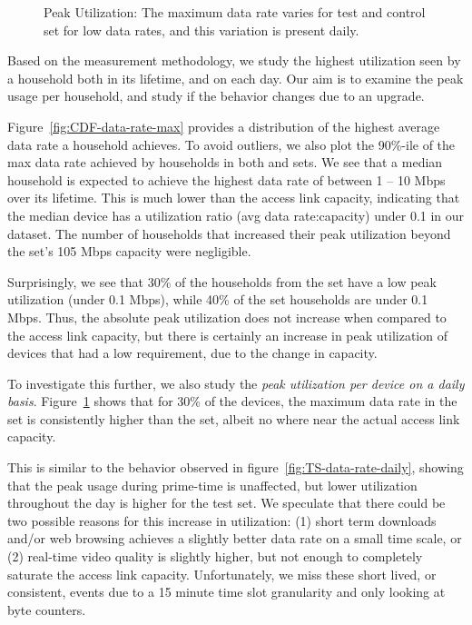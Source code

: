 \begin{figure}[ht!]
\begin{minipage}{0.90\linewidth}
\begin{subfigure}[b]{0.90\linewidth}
  \label{fig:CDF-data-rate-max-daily}
\end{subfigure}
\end{minipage}
\caption{Peak Utilization: The maximum data rate varies for test and control 
set 
for low data rates, and this variation is present daily.}
\label{fig:peak-utilization}
\end{figure}



Based on the measurement methodology, we study the highest utilization seen by a 
household
both in its lifetime, and on each day. Our aim is to examine the peak usage per 
household, and
study if the behavior changes due to an upgrade.

Figure~\ref{fig:CDF-data-rate-max} provides a distribution of the highest 
average
data rate a household achieves. To avoid outliers, we also plot the 90\%-ile of 
the max
data rate achieved by households in both \test and \control sets. We see that a 
median
household is expected to achieve the highest data rate of between 1 -- 10 Mbps 
over its
lifetime. This is much lower than the access link capacity,
indicating that the median device has a utilization ratio (avg data 
rate:capacity) under
0.1 in our dataset. The number of households that increased their peak 
utilization beyond
the \control set's 105 Mbps capacity were negligible.

Surprisingly, we see that 30\% of the households from the \test set have a low 
peak
utilization (under 0.1 Mbps), while 40\% of the \control set households are 
under 0.1 Mbps.
Thus, the absolute peak utilization does not increase when compared to the 
access link
capacity, but there is certainly an increase in peak utilization of devices that 
had a low
requirement, due to the change in capacity.

To investigate this further, we also study the \emph{peak utilization per device 
on a daily basis}.
Figure~\ref{fig:CDF-data-rate-max-daily} shows that for 30\% of the devices,
the maximum data rate in the \test set is consistently higher than the \control 
set, albeit
no where near the actual access link capacity.

This is similar to the behavior observed in figure~\ref{fig:TS-data-rate-daily}, 
showing that the peak
usage during prime-time is unaffected, but lower utilization throughout the day 
is higher
for the test set. We speculate that there could be two possible reasons for this 
increase
in utilization: (1) short term downloads and/or web browsing achieves a slightly 
better
data rate on a small time scale, or (2) real-time video quality is slightly 
higher, but
not enough to completely saturate the access link capacity. Unfortunately, we 
miss these
short lived, or consistent, events due to a 15 minute time slot granularity and 
only
looking at byte counters.



